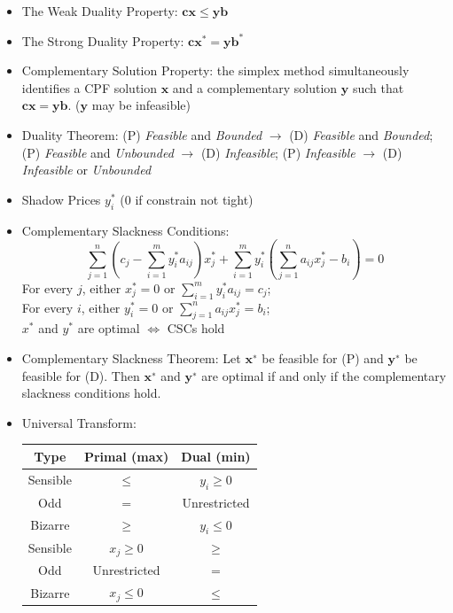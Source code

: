 \documentclass[10pt, twocolumn]{article}
\begin{document}
\begin{itemize}
\item The Weak Duality Property: $\boldsymbol{cx} \leq \boldsymbol{yb}$
\item The Strong Duality Property: $\boldsymbol{cx}^* = \boldsymbol{yb}^*$
\item Complementary Solution Property: the simplex method simultaneously identifies a CPF solution $\boldsymbol{x}$ and a complementary solution $\boldsymbol{y}$ such that $\boldsymbol{cx} = \boldsymbol{yb}$. ($\boldsymbol{y}$ may be infeasible)
\item Duality Theorem: (P) \emph{Feasible} and \emph{Bounded} $\longrightarrow$ (D) \emph{Feasible} and \emph{Bounded}; (P) \emph{Feasible} and \emph{Unbounded} $\longrightarrow$ (D) \emph{Infeasible}; (P) \emph{Infeasible} $\longrightarrow$ (D) \emph{Infeasible} or \emph{Unbounded}
\item Shadow Prices $y_i^*$ ($0$ if constrain not tight)
\item Complementary Slackness Conditions: 
\[ \sum\limits_{j=1}^n (c_j-\sum\limits_{i=1}^my_i^*a_{ij})x_j^* + \sum\limits_{i=1}^m y_i^*(\sum\limits_{j=1}^na_{ij}x_j^*-b_i) = 0 \]
For every $j$, either $x_j^*=0$ or $\sum_{i=1}^my_i^*a_{ij}=c_j$; \\
For every $i$, either $y_i^*=0$ or $\sum_{j=1}^na_{ij}x_j^*=b_i$; \\
$x^*$ and $y^*$ are optimal $\Longleftrightarrow$ CSCs hold
\item Complementary Slackness Theorem: Let $\boldsymbol{x}^∗$ be feasible for (P) and $\boldsymbol{y}^∗$ be feasible for (D). Then $\boldsymbol{x}^∗$ and $\boldsymbol{y}^∗$ are optimal if and only if the complementary slackness conditions hold.
\item Universal Transform: 
\begin{table}[h]
\centering
\begin{tabular}{|c|c|c|} \hline
Type     & Primal (max) & Dual (min)   \\ \hline
Sensible & $\leq$       & $y_i \geq 0$ \\
Odd      & $=$          & Unrestricted \\
Bizarre  & $\geq$       & $y_i \leq 0$ \\ \hline
Sensible & $x_j \geq 0$ & $\geq$       \\
Odd      & Unrestricted & $=$          \\
Bizarre  & $x_j \leq 0$ & $\leq$       \\ \hline

\end{tabular}
\end{table}
\end{itemize}
\end{document}
